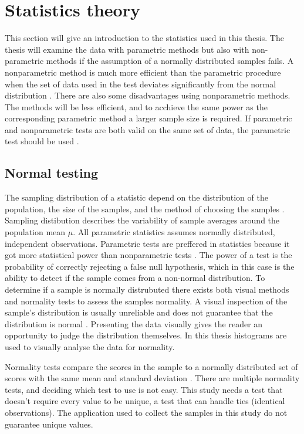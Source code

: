 \section{Statistics theory}\label{sec:statistic_theory}
This section will give an introduction to the statistics used in this thesis. The thesis will examine the data with parametric methods but also with non-parametric methods if the assumption of a normally distributed samples fails. A nonparametric method is much more efficient than the parametric procedure when the set of data used in the test deviates significantly from the normal distribution \citep{Walpole2012}. There are also some disadvantages using nonparametric methods. The methods will be less efficient, and to acchieve the same power as the corresponding parametric method a larger sample size is required. If parametric and nonparametric tests are both valid on the same set of data, the parametric test should be used \citep{Walpole2012}. 

\subsection{Normal testing}\label{sec:normaltesting}
The sampling distribution of a statistic depend on the distribution of the population, the size of the samples, and the method of choosing the samples \citep{Walpole2012}. Sampling distibution describes the variability of sample averages around the population mean $\mu$. All parametric statistics assumes normally distributed, independent observations. Parametric tests are preffered in statistics because it got more statistical power than nonparametric tests \citep{Frost2015}. The power of a test is the probability of correctly rejecting a false null hypothesis, which in this case is the ability to detect if the sample comes from a non-normal distribution. To determine if a sample is normally distrubuted there exists both visual methods and normality tests to assess the samples normality. A visual inspection of the sample's distribution is usually unreliable and does not guarantee that the distribution is normal \citep{Pearson2006}. Presenting the data visually gives the reader an opportunity to judge the distribution themselves. In this thesis histograms are used to visually analyse the data for normality. 

Normality tests compare the scores in the sample to a normally distributed set of scores with the same mean and standard deviation \citep{Ghasemi2012}. There are multiple normality tests, and deciding which test to use is not easy. This study needs a test that doesn't require every value to be unique, a test that can handle ties (identical observations). The application used to collect the samples in this study do not guarantee unique values. 

